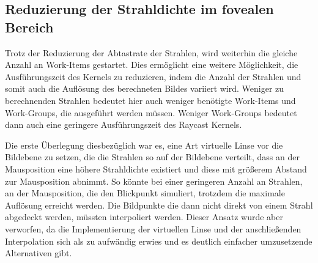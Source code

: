 \subsection{Reduzierung der Strahldichte im fovealen Bereich}\label{ss::MDC}
Trotz der Reduzierung der Abtastrate der Strahlen, wird weiterhin die gleiche Anzahl an Work-Items gestartet.
Dies ermöglicht eine weitere Möglichkeit, die Ausführungszeit des Kernels zu reduzieren, indem die Anzahl der Strahlen und somit auch die Auflösung des berechneten Bildes variiert wird.
Weniger zu berechnenden Strahlen bedeutet hier auch weniger benötigte Work-Items und Work-Groups, die ausgeführt werden müssen.
Weniger Work-Groups bedeutet dann auch eine geringere Ausführungszeit des Raycast Kernels.

Die erste Überlegung diesbezüglich war es, eine Art virtuelle Linse vor die Bildebene zu setzen, die die Strahlen so auf der Bildebene verteilt, dass an der Mausposition eine höhere Strahldichte existiert und diese mit größerem Abstand zur Mausposition abnimmt.
So könnte bei einer geringeren Anzahl an Strahlen, an der Mausposition, die den Blickpunkt simuliert, trotzdem die maximale Auflösung erreicht werden.
Die Bildpunkte die dann nicht direkt von einem Strahl abgedeckt werden, müssten interpoliert werden.
Dieser Ansatz wurde aber verworfen, da die Implementierung der virtuellen Linse und der anschließenden Interpolation sich als zu aufwändig erwies und es deutlich einfacher umzusetzende Alternativen gibt.

